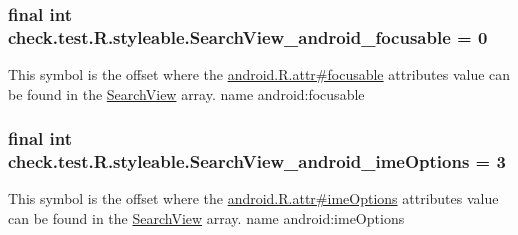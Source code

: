 \subsubsection[{Search\+View\+\_\+android\+\_\+focusable}]{\setlength{\rightskip}{0pt plus 5cm}final int check.\+test.\+R.\+styleable.\+Search\+View\+\_\+android\+\_\+focusable = 0\hspace{0.3cm}{\ttfamily [static]}}\label{classcheck_1_1test_1_1_r_1_1styleable_a689e5c0ac8c31670b6e71cfaba9e2c0b}
This symbol is the offset where the \hyperlink{}{android.\+R.\+attr\#focusable} attribute\textquotesingle{}s value can be found in the \hyperlink{classcheck_1_1test_1_1_r_1_1styleable_af133609668e9a4263b21387e9a7574f8}{Search\+View} array.  name android\+:focusable \hypertarget{classcheck_1_1test_1_1_r_1_1styleable_ac373b6a41705a4741ee109683c6b18fb}{}
\subsubsection[{Search\+View\+\_\+android\+\_\+ime\+Options}]{\setlength{\rightskip}{0pt plus 5cm}final int check.\+test.\+R.\+styleable.\+Search\+View\+\_\+android\+\_\+ime\+Options = 3\hspace{0.3cm}{\ttfamily [static]}}\label{classcheck_1_1test_1_1_r_1_1styleable_ac373b6a41705a4741ee109683c6b18fb}
This symbol is the offset where the \hyperlink{}{android.\+R.\+attr\#ime\+Options} attribute\textquotesingle{}s value can be found in the \hyperlink{classcheck_1_1test_1_1_r_1_1styleable_af133609668e9a4263b21387e9a7574f8}{Search\+View} array.  name android\+:ime\+Options \hypertarget{classcheck_1_1test_1_1_r_1_1styleable_a94590242dae34b9e05ef2e5e71613cb4}{}
